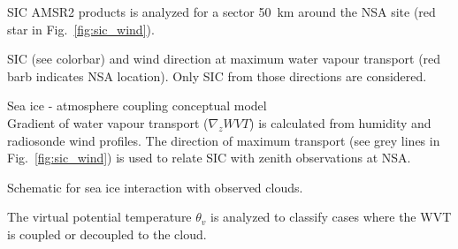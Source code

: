 \documentclass[portrate,paperwidth=841mm,paperheight=1189mm,fontscale=0.4,margin=1cm]{baposter}
\begin{document}
\begin{poster}
{\colouredcircle SIC AMSR2 products is analyzed for a sector 50~km around the NSA site (red star in Fig.~\ref{fig:sic_wind}).\\
\begin{minipage}{0.95\textwidth}
	\centering
	\caption{\small SIC (see colorbar) and wind direction at maximum water vapour transport (red barb indicates NSA location). Only SIC from those directions are considered.}
	\label{fig:sic_wind}
\end{minipage}

\colouredcircle Sea ice - atmosphere coupling conceptual model\\
Gradient of water vapour transport ($\nabla_z WVT$) is calculated from humidity and radiosonde wind profiles. The direction of maximum transport (see grey lines in Fig.~\ref{fig:sic_wind}) is used to relate SIC with zenith observations at NSA.
\begin{minipage}{0.9\textwidth}
	\centering
	\caption{\small Schematic for sea ice interaction with observed clouds.}
	\label{fig:leadcloud}
\end{minipage}

The virtual potential temperature $\theta_v$ is analyzed to classify cases where the WVT is coupled or decoupled to the cloud.

}
\end{poster}
\end{document}
